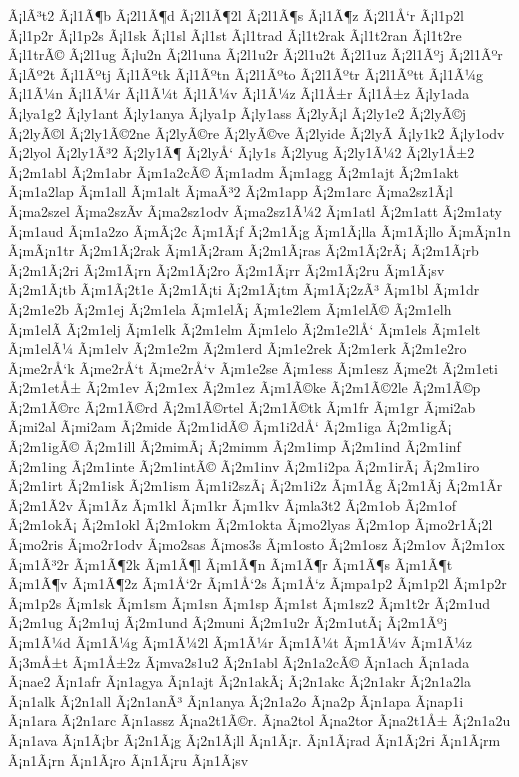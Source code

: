 {Ã¡lÃ³t2
Ã¡l1Ã¶b
Ã¡2l1Ã¶d
Ã¡2l1Ã¶2l
Ã¡2l1Ã¶s
Ã¡l1Ã¶z
Ã¡2l1Å‘r
Ã¡l1p2l
Ã¡l1p2r
Ã¡l1p2s
Ã¡l1sk
Ã¡l1sl
Ã¡l1st
Ã¡l1trad
Ã¡l1t2rak
Ã¡l1t2ran
Ã¡l1t2re
Ã¡l1trÃ©
Ã¡2l1ug
Ã¡lu2n
Ã¡2l1una
Ã¡2l1u2r
Ã¡2l1u2t
Ã¡2l1uz
Ã¡2l1Ãºj
Ã¡2l1Ãºr
Ã¡lÃº2t
Ã¡l1Ãºtj
Ã¡l1Ãºtk
Ã¡l1Ãºtn
Ã¡2l1Ãºto
Ã¡2l1Ãºtr
Ã¡2l1Ãºtt
Ã¡l1Ã¼g
Ã¡l1Ã¼n
Ã¡l1Ã¼r
Ã¡l1Ã¼t
Ã¡l1Ã¼v
Ã¡l1Ã¼z
Ã¡l1Å±r
Ã¡l1Å±z
Ã¡ly1ada
Ã¡lya1g2
Ã¡ly1ant
Ã¡ly1anya
Ã¡lya1p
Ã¡ly1ass
Ã¡2lyÃ¡l
Ã¡2ly1e2
Ã¡2lyÃ©j
Ã¡2lyÃ©l
Ã¡2ly1Ã©2ne
Ã¡2lyÃ©re
Ã¡2lyÃ©ve
Ã¡2lyide
Ã¡2lyÃ­
Ã¡ly1k2
Ã¡ly1odv
Ã¡2lyol
Ã¡2ly1Ã³2
Ã¡2ly1Ã¶
Ã¡2lyÅ‘
Ã¡ly1s
Ã¡2lyug
Ã¡2ly1Ã¼2
Ã¡2ly1Å±2
Ã¡2m1abl
Ã¡2m1abr
Ã¡m1a2cÃ©
Ã¡m1adm
Ã¡m1agg
Ã¡2m1ajt
Ã¡2m1akt
Ã¡m1a2lap
Ã¡m1all
Ã¡m1alt
Ã¡maÃ³2
Ã¡2m1app
Ã¡2m1arc
Ã¡ma2sz1Ã¡l
Ã¡ma2szel
Ã¡ma2szÃ­v
Ã¡ma2sz1odv
Ã¡ma2sz1Ã¼2
Ã¡m1atl
Ã¡2m1att
Ã¡2m1aty
Ã¡m1aud
Ã¡m1a2zo
Ã¡mÃ¡2c
Ã¡m1Ã¡f
Ã¡2m1Ã¡g
Ã¡m1Ã¡lla
Ã¡m1Ã¡llo
Ã¡mÃ¡n1n
Ã¡mÃ¡n1tr
Ã¡2m1Ã¡2rak
Ã¡m1Ã¡2ram
Ã¡2m1Ã¡ras
Ã¡2m1Ã¡2rÃ¡
Ã¡2m1Ã¡rb
Ã¡2m1Ã¡2ri
Ã¡2m1Ã¡rn
Ã¡2m1Ã¡2ro
Ã¡2m1Ã¡rr
Ã¡2m1Ã¡2ru
Ã¡m1Ã¡sv
Ã¡2m1Ã¡tb
Ã¡m1Ã¡2t1e
Ã¡2m1Ã¡ti
Ã¡2m1Ã¡tm
Ã¡m1Ã¡2zÃ³
Ã¡m1bl
Ã¡m1dr
Ã¡2m1e2b
Ã¡2m1ej
Ã¡2m1ela
Ã¡m1elÃ¡
Ã¡m1e2lem
Ã¡m1elÃ©
Ã¡2m1elh
Ã¡m1elÃ­
Ã¡2m1elj
Ã¡m1elk
Ã¡2m1elm
Ã¡m1elo
Ã¡2m1e2lÅ‘
Ã¡m1els
Ã¡m1elt
Ã¡m1elÃ¼
Ã¡m1elv
Ã¡2m1e2m
Ã¡2m1erd
Ã¡m1e2rek
Ã¡2m1erk
Ã¡2m1e2ro
Ã¡me2rÅ‘k
Ã¡me2rÅ‘t
Ã¡me2rÅ‘v
Ã¡m1e2se
Ã¡m1ess
Ã¡m1esz
Ã¡me2t
Ã¡2m1eti
Ã¡2m1etÅ±
Ã¡2m1ev
Ã¡2m1ex
Ã¡2m1ez
Ã¡m1Ã©ke
Ã¡2m1Ã©2le
Ã¡2m1Ã©p
Ã¡2m1Ã©rc
Ã¡2m1Ã©rd
Ã¡2m1Ã©rtel
Ã¡2m1Ã©tk
Ã¡m1fr
Ã¡m1gr
Ã¡mi2ab
Ã¡mi2al
Ã¡mi2am
Ã¡2mide
Ã¡2m1idÃ©
Ã¡m1i2dÅ‘
Ã¡2m1iga
Ã¡2m1igÃ¡
Ã¡2m1igÃ©
Ã¡2m1ill
Ã¡2mimÃ¡
Ã¡2mimm
Ã¡2m1imp
Ã¡2m1ind
Ã¡2m1inf
Ã¡2m1ing
Ã¡2m1inte
Ã¡2m1intÃ©
Ã¡2m1inv
Ã¡2m1i2pa
Ã¡2m1irÃ¡
Ã¡2m1iro
Ã¡2m1irt
Ã¡2m1isk
Ã¡2m1ism
Ã¡m1i2szÃ¡
Ã¡2m1i2z
Ã¡m1Ã­g
Ã¡2m1Ã­j
Ã¡2m1Ã­r
Ã¡2m1Ã­2v
Ã¡m1Ã­z
Ã¡m1kl
Ã¡m1kr
Ã¡m1kv
Ã¡mla3t2
Ã¡2m1ob
Ã¡2m1of
Ã¡2m1okÃ¡
Ã¡2m1okl
Ã¡2m1okm
Ã¡2m1okta
Ã¡mo2lyas
Ã¡2m1op
Ã¡mo2r1Ã¡2l
Ã¡mo2ris
Ã¡mo2r1odv
Ã¡mo2sas
Ã¡mos3s
Ã¡m1osto
Ã¡2m1osz
Ã¡2m1ov
Ã¡2m1ox
Ã¡m1Ã³2r
Ã¡m1Ã¶2k
Ã¡m1Ã¶l
Ã¡m1Ã¶n
Ã¡m1Ã¶r
Ã¡m1Ã¶s
Ã¡m1Ã¶t
Ã¡m1Ã¶v
Ã¡m1Ã¶2z
Ã¡m1Å‘2r
Ã¡m1Å‘2s
Ã¡m1Å‘z
Ã¡mpa1p2
Ã¡m1p2l
Ã¡m1p2r
Ã¡m1p2s
Ã¡m1sk
Ã¡m1sm
Ã¡m1sn
Ã¡m1sp
Ã¡m1st
Ã¡m1sz2
Ã¡m1t2r
Ã¡2m1ud
Ã¡2m1ug
Ã¡2m1uj
Ã¡2m1und
Ã¡2muni
Ã¡2m1u2r
Ã¡2m1utÃ¡
Ã¡2m1Ãºj
Ã¡m1Ã¼d
Ã¡m1Ã¼g
Ã¡m1Ã¼2l
Ã¡m1Ã¼r
Ã¡m1Ã¼t
Ã¡m1Ã¼v
Ã¡m1Ã¼z
Ã¡3mÅ±t
Ã¡m1Å±2z
Ã¡mva2s1u2
Ã¡2n1abl
Ã¡2n1a2cÃ©
Ã¡n1ach
Ã¡n1ada
Ã¡nae2
Ã¡n1afr
Ã¡n1agya
Ã¡n1ajt
Ã¡2n1akÃ¡
Ã¡2n1akc
Ã¡2n1akr
Ã¡2n1a2la
Ã¡n1alk
Ã¡2n1all
Ã¡2n1anÃ³
Ã¡n1anya
Ã¡2n1a2o
Ã¡na2p
Ã¡n1apa
Ã¡nap1i
Ã¡n1ara
Ã¡2n1arc
Ã¡n1assz
Ã¡na2t1Ã©r.
Ã¡na2tol
Ã¡na2tor
Ã¡na2t1Å±
Ã¡2n1a2u
Ã¡n1ava
Ã¡n1Ã¡br
Ã¡2n1Ã¡g
Ã¡2n1Ã¡ll
Ã¡n1Ã¡r.
Ã¡n1Ã¡rad
Ã¡n1Ã¡2ri
Ã¡n1Ã¡rm
Ã¡n1Ã¡rn
Ã¡n1Ã¡ro
Ã¡n1Ã¡ru
Ã¡n1Ã¡sv
}
